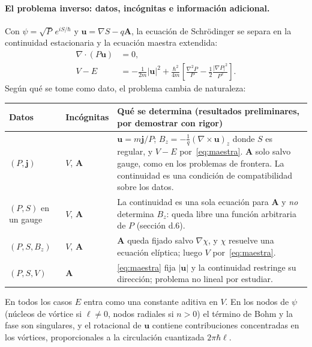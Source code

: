 \documentclass[12pt,letterpaper]{article}
\newcommand{\uv}{\mathbf{u}}
\newcommand{\jv}{\mathbf{j}}
\newcommand{\Av}{\mathbf{A}}
\newcommand{\grad}{\nabla}
\begin{document}
\paragraph{El problema inverso: datos, incógnitas e información adicional.} Con $\psi=\sqrt P\,e^{iS/\hbar}$ y
$\uv=\grad S-q\Av$, la ecuación de Schrödinger se separa en la continuidad estacionaria y la ecuación maestra extendida:
\begin{align}
  \grad\cdot(P\uv)&=0, \label{eq:cont}\\
  V-E&=-\frac{1}{2m}|\uv|^2+\frac{\hbar^2}{4m}\!\left[\frac{\grad^2P}{P}-\frac12\frac{|\grad P|^2}{P^2}\right].
  \label{eq:maestra}
\end{align}
Según qué se tome como dato, el problema cambia de naturaleza:
\begin{center}
\begin{tabular}{@{}p{2.6cm} p{3.2cm} p{8.6cm}@{}}
\toprule
\textbf{Datos} & \textbf{Incógnitas} & \textbf{Qué se determina} (resultados preliminares, por demostrar con rigor) \\
\midrule
$(P,\jv)$ & $V$, $\Av$ & $\uv=m\jv/P$; $B_z=-\frac{1}{q}(\grad\times\uv)_z$ donde $S$ es regular, y $V-E$ por~\eqref{eq:maestra}.
$\Av$ solo salvo gauge, como en los problemas de frontera. La continuidad es una condición de compatibilidad sobre los datos. \\
$(P,S)$ en un gauge & $V$, $\Av$ & La continuidad es una sola ecuación para $\Av$ y \emph{no} determina $B_z$: queda libre una
función arbitraria de $P$ (sección d.6). \\
$(P,S,B_z)$ & $V$, $\Av$ & $\Av$ queda fijado salvo $\grad\chi$, y $\chi$ resuelve una ecuación elíptica; luego $V$ por~\eqref{eq:maestra}. \\
$(P,S,V)$ & $\Av$ & \eqref{eq:maestra} fija $|\uv|$ y la continuidad restringe su dirección; problema no lineal por estudiar. \\
\bottomrule
\end{tabular}
\end{center}
En todos los casos $E$ entra como una constante aditiva en $V$. En los nodos de $\psi$ (núcleos de vórtice si $\ell\neq0$,
nodos radiales si $n>0$) el término de Bohm y la fase son singulares, y el rotacional de $\uv$ contiene contribuciones
concentradas en los vórtices, proporcionales a la circulación cuantizada $2\pi\hbar\ell$.
\end{document}
